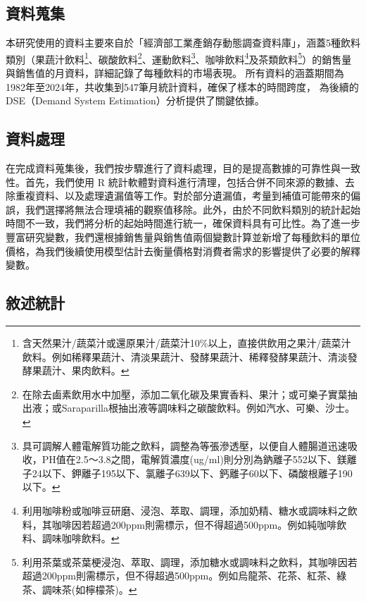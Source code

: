 \subsection{資料蒐集}
本研究使用的資料主要來自於「經濟部工業產銷存動態調查資料庫」\citep{moea_statistics}，涵蓋5種飲料類別（果蔬汁飲料\footnote{含天然果汁/蔬菜汁或還原果汁/蔬菜汁10\%以上，直接供飲用之果汁/蔬菜汁飲料。例如稀釋果蔬汁、清淡果蔬汁、發酵果蔬汁、稀釋發酵果蔬汁、清淡發酵果蔬汁、果肉飲料。
}、碳酸飲料\footnote{在除去鹵素飲用水中加壓，添加二氧化碳及果實香料、果汁；或可樂子實葉抽出液；或Saraparilla根抽出液等調味料之碳酸飲料。例如汽水、可樂、沙士。
}、運動飲料\footnote{具可調解人體電解質功能之飲料，調整為等張滲透壓，以便自人體腸道迅速吸收，PH值在2.5～3.8之間，電解質濃度(ug/ml)則分別為鈉離子552以下、鎂離子24以下、鉀離子195以下、氯離子639以下、鈣離子60以下、磷酸根離子190以下。
}、咖啡飲料\footnote{利用咖啡粉或咖啡豆研磨、浸泡、萃取、調理，添加奶精、糖水或調味料之飲料，其咖啡因若超過200ppm則需標示，但不得超過500ppm。例如純咖啡飲料、調味咖啡飲料。
}及茶類飲料\footnote{利用茶葉或茶葉梗浸泡、萃取、調理，添加糖水或調味料之飲料，其咖啡因若超過200ppm則需標示，但不得超過500ppm。例如烏龍茶、花茶、紅茶、綠茶、調味茶(如檸檬茶)。
}）的銷售量與銷售值的月資料，詳細記錄了每種飲料的市場表現。
所有資料的涵蓋期間為1982年至2024年，共收集到547筆月統計資料，確保了樣本的時間跨度，
為後續的DSE（Demand System Estimation）分析提供了關鍵依據。

\subsection{資料處理}

在完成資料蒐集後，我們按步驟進行了資料處理，目的是提高數據的可靠性與一致性。首先，我們使用 R 統計軟體對資料進行清理，包括合併不同來源的數據、去除重複資料、以及處理遺漏值等工作。對於部分遺漏值，考量到補值可能帶來的偏誤，我們選擇將無法合理填補的觀察值移除。此外，由於不同飲料類別的統計起始時間不一致，我們將分析的起始時間進行統一，確保資料具有可比性。為了進一步豐富研究變數，我們還根據銷售量與銷售值兩個變數計算並新增了每種飲料的單位價格，為我們後續使用模型估計去衡量價格對消費者需求的影響提供了必要的解釋變數。

\subsection{敘述統計}

